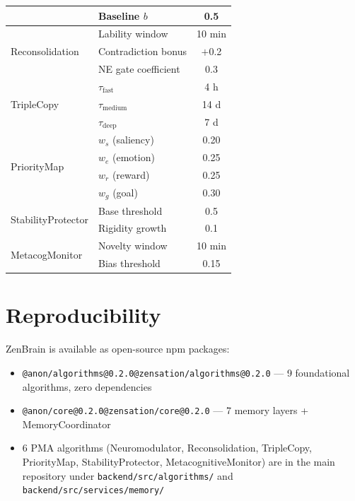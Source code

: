 \documentclass{article}
\makeatletter
\newcommand{\anon}[2]{\if@anonymous #2\else #1\fi}
\makeatother
\begin{document}
\begin{table}[h]
\begin{tabular}{llc}
        & Baseline $b$ & 0.5 \\
        \midrule
        \multirow{3}{*}{Reconsolidation} & Lability window & 10 min \\
        & Contradiction bonus & $+$0.2 \\
        & NE gate coefficient & 0.3 \\
        \midrule
        \multirow{3}{*}{TripleCopy} & $\tau_{\text{fast}}$ & 4 h \\
        & $\tau_{\text{medium}}$ & 14 d \\
        & $\tau_{\text{deep}}$ & 7 d \\
        \midrule
        \multirow{4}{*}{PriorityMap} & $w_s$ (saliency) & 0.20 \\
        & $w_e$ (emotion) & 0.25 \\
        & $w_r$ (reward) & 0.25 \\
        & $w_g$ (goal) & 0.30 \\
        \midrule
        \multirow{2}{*}{StabilityProtector} & Base threshold & 0.5 \\
        & Rigidity growth & 0.1 \\
        \midrule
        \multirow{2}{*}{MetacogMonitor} & Novelty window & 10 min \\
        & Bias threshold & 0.15 \\
        \bottomrule
    \end{tabular}
\end{table}

\section{Reproducibility}
\label{app:reproducibility}

ZenBrain is available as open-source npm packages:
\begin{itemize}
    \item \anon{\texttt{@zensation/algorithms@0.2.0}}{\texttt{@anon/algorithms@0.2.0}} --- 9 foundational algorithms, zero dependencies
    \item \anon{\texttt{@zensation/core@0.2.0}}{\texttt{@anon/core@0.2.0}} --- 7 memory layers + MemoryCoordinator
    \item 6 PMA algorithms (Neuromodulator, Reconsolidation, TripleCopy, PriorityMap, StabilityProtector, MetacognitiveMonitor) are in the main repository under \texttt{backend/src/algorithms/} and \texttt{backend/src/services/memory/}
\end{itemize}
\end{document}
